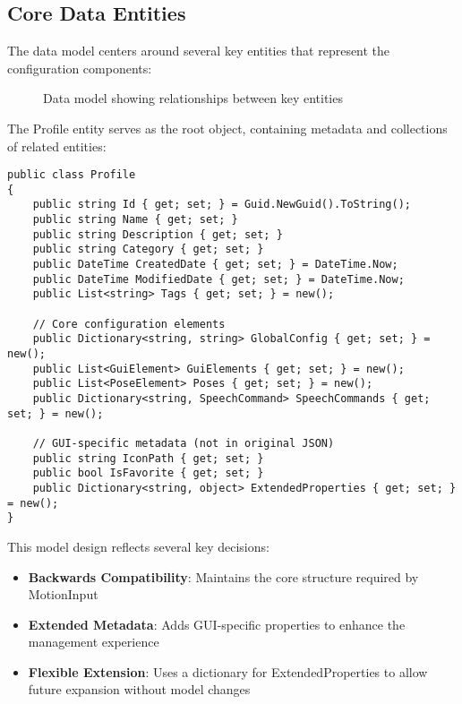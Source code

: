 \subsection{Core Data Entities}
The data model centers around several key entities that represent the configuration components:

\begin{figure}[h]
\centering
\caption{Data model showing relationships between key entities}
\label{fig:data_model}
\end{figure}

The Profile entity serves as the root object, containing metadata and collections of related entities:

\begin{verbatim}
public class Profile
{
    public string Id { get; set; } = Guid.NewGuid().ToString();
    public string Name { get; set; }
    public string Description { get; set; }
    public string Category { get; set; }
    public DateTime CreatedDate { get; set; } = DateTime.Now;
    public DateTime ModifiedDate { get; set; } = DateTime.Now;
    public List<string> Tags { get; set; } = new();
    
    // Core configuration elements
    public Dictionary<string, string> GlobalConfig { get; set; } = new();
    public List<GuiElement> GuiElements { get; set; } = new();
    public List<PoseElement> Poses { get; set; } = new();
    public Dictionary<string, SpeechCommand> SpeechCommands { get; set; } = new();
    
    // GUI-specific metadata (not in original JSON)
    public string IconPath { get; set; }
    public bool IsFavorite { get; set; }
    public Dictionary<string, object> ExtendedProperties { get; set; } = new();
}
\end{verbatim}

This model design reflects several key decisions:

\begin{itemize}
    \item \textbf{Backwards Compatibility}: Maintains the core structure required by MotionInput
    \item \textbf{Extended Metadata}: Adds GUI-specific properties to enhance the management experience
    \item \textbf{Flexible Extension}: Uses a dictionary for ExtendedProperties to allow future expansion without model changes
\end{itemize}


